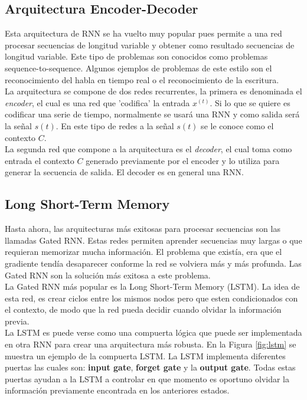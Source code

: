     \subsection{Arquitectura Encoder-Decoder}
    Esta arquitectura de RNN se ha vuelto muy popular pues permite a una red procesar secuencias de longitud variable y obtener como resultado secuencias de longitud variable. Este tipo de problemas son conocidos como problemas sequence-to-sequence. Algunos ejemplos de problemas de este estilo son el reconocimiento del habla en tiempo real o el reconocimiento de la escritura. \\
    
    La arquitectura se compone de dos redes recurrentes, la primera es denominada el \textit{encoder}, el cual es una red que 'codifica' la entrada $x^{(t)}$. Si lo que se quiere es codificar una serie de tiempo, normalmente se usará una RNN y como salida será la señal $s(t)$. En este tipo de redes a la señal $s(t)$ se le conoce como el contexto $C$. \\
    
    La segunda red que compone a la arquitectura es el \textit{decoder}, el cual toma como entrada el contexto $C$ generado previamente por el encoder y lo utiliza para generar la secuencia de salida. El decoder es en general una RNN.
    
    \subsection{Long Short-Term Memory}
   	Hasta ahora, las arquitecturas más exitosas para procesar secuencias son las llamadas Gated RNN. Estas redes permiten aprender secuencias muy largas o que requieran memorizar mucha información. El problema que existía, era que el gradiente tendía desaparecer conforme la red se volviera más y más profunda. Las Gated RNN son la solución más exitosa a este problema. \\
   	
   	La Gated RNN más popular es la Long Short-Term Memory (LSTM). La idea de esta red, es crear ciclos entre los mismos nodos pero que esten condicionados con el contexto, de modo que la red pueda decidir cuando olvidar la información previa. \\
   	
   	La LSTM es puede verse como una compuerta lógica que puede ser implementada en otra RNN para crear una arquitectura más robusta. En la Figura \ref{fig:lstm} se muestra un ejemplo de la compuerta LSTM. La LSTM implementa diferentes puertas las cuales son: \textbf{input gate}, \textbf{forget gate} y la \textbf{output gate}. Todas estas puertas ayudan a la LSTM a controlar en que momento es oportuno olvidar la información previamente encontrada en los anteriores estados. \\
   	
